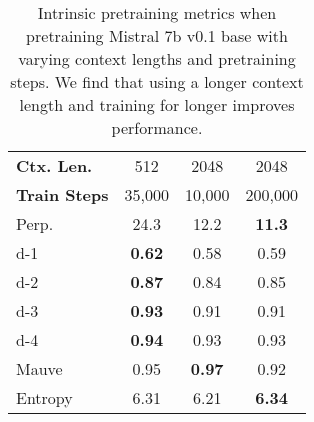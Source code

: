 \begin{table}[]
\centering
\begin{tabular}{@{}lccc@{}}
\toprule
\textbf{Ctx. Len.} & 512 & 2048 & 2048 \\
\textbf{Train Steps} & 35,000 & 10,000 & 200,000 \\ \midrule
Perp. & 24.3 & 12.2 & \textbf{11.3} \\
d-1 & \textbf{0.62} & 0.58 & 0.59 \\
d-2 & \textbf{0.87} & 0.84 & 0.85 \\
d-3 & \textbf{0.93} & 0.91 & 0.91 \\
d-4 & \textbf{0.94} & 0.93 & 0.93 \\
Mauve & 0.95 & \textbf{0.97} & 0.92 \\
Entropy & 6.31 & 6.21 & \textbf{6.34} \\ \bottomrule
\end{tabular}
\caption{Intrinsic pretraining metrics when pretraining Mistral 7b v0.1 base with varying context lengths and pretraining steps. We find that using a longer context length and training for longer improves performance.}
\label{tab:ctx_len_exp}
\end{table}